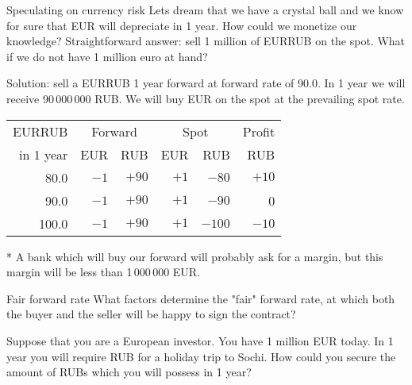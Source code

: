 \documentclass{beamer}
\begin{document}
\begin{frame}{Speculating on currency risk}
\justify
Lets dream that we have a crystal ball and we know for sure that EUR will depreciate in 1 year. How could we monetize our knowledge? Straightforward answer: sell 1 million of EURRUB on the spot. What if we do not have 1 million euro at hand?

\justify
Solution: sell a EURRUB 1 year forward at forward rate of 90.0. In 1 year  we will receive 90\,000\,000 RUB. We will buy EUR on the spot at the prevailing spot rate.

\justify
\centering
\begin{tabular}{r|r|r|r|r|r}
EURRUB      & \multicolumn{2}{c|}{Forward} & \multicolumn{2}{c|}{Spot} & Profit \\
\cline{2-5}
in 1 year & EUR     & RUB     & EUR     & RUB      & RUB \\ \hline
80.0      & $-1$ & $+90$  & $+1$ & $-80$ & $+10$ \\
90.0      & $-1$ & $+90$  & $+1$ & $-90$ & 0 \\
100.0     & $-1$& $+90$  & $+1$ & $-100$ & $-10$ \\
\end{tabular}
 
\justify
* A bank which will buy our forward will probably ask for a margin, but this margin will be less than 1\,000\,000 EUR.
\end{frame}



\begin{frame}{Fair forward rate}
\justify
What factors determine the "fair" forward rate, at which both the buyer and the seller will be happy to sign the contract? 

\justify
Suppose that you are a European investor. You have 1 million EUR today. In 1 year you will require RUB for a holiday trip to Sochi. How could you secure the amount of RUBs which you will possess in 1 year?
\end{frame}
\end{document}
